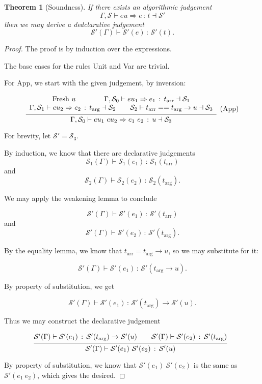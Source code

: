 \documentclass{article}
\newtheorem{theorem}{Theorem}
\newcommand{\G}{\Gamma}
\newcommand{\St}{\mathcal{S}}
\newcommand{\tp}{t}
\newcommand{\tarr}{t_{\text{arr}}}
\newcommand{\targ}{t_{\text{arg}}}
\newcommand{\uv}{u}
\newcommand{\eu}{eu}
\newcommand{\e}{e}
\newcommand{\spc}{\qquad}
\newcommand{\eq}{==}
\renewcommand{\implies}{\Rightarrow}
\newcommand{\fresh}{\text{Fresh}\ }
\newcommand{\withtp}[2]{{#1} \,:\, {#2}}
\newcommand{\app}[2]{{#1}\ {#2}}
\newcommand{\arr}[2]{{#1} \to {#2}}
\newcommand{\hastp}[3]{#1 \vdash {\withtp {#2} {#3}}}
\newcommand{\algtp}[6]{#1, #2 \vdash #3 \implies {\withtp {#4} {#5}} \dashv #6}
\newcommand{\equals}[4]{{#1} \vdash {#2} \eq {#3} \dashv {#4}}
\newcommand{\deduct}[3][]
{
  \begin{prooftree}
    \hypo{#2}
    \infer1[\text{#1}]{#3}
  \end{prooftree}
}
\begin{document}
\begin{theorem}[Soundness]
  If there exists an algorithmic judgement
\[ \algtp \G \St \eu \e \tp \St' \]
  then we may derive a dedclarative judgement
\[ \hastp {\St'(\G)} {\St'(\e)} {\St'(t)}.\]
\end{theorem}

\begin{proof}
  The proof is by induction over the expressions.

  The base cases for the rules Unit and Var are trivial.

  For App, we start with the given judgement, by inversion:

\[
  \deduct
  {\begin{array}{c}
    \fresh \uv \spc \spc
   \algtp \G {\St_0} {\eu_1} {\e_1} \tarr {\St_1} \\
   \algtp \G {\St_1} {\eu_2} {\e_2} \targ {\St_2} \spc
   \equals {\St_2} {\tarr} {\arr {\targ} \uv} {\St_3}
   \end{array}
  }
  {\algtp \G {\St_0} {\app {\eu_1} {\eu_2}} {\app {\e_1} {\e_2}} {\uv} {\St_3}}
  {\text{(App)}}
\]

  For brevity, let \(\St' = \St_3\).

  By induction, we know that there are declarative judgements
  \[ \hastp {\St_1(\G)} {\St_1(\e_1)} {\St_1(\tarr)} \]
  and
  \[ \hastp {\St_2(\G)} {\St_2(\e_2)} {\St_2(\targ)}.\]

  We may apply the weakening lemma to conclude 

  \[ \hastp {\St'(\G)} {\St'(\e_1)} {\St'(\tarr)} \]
  and
  \[ \hastp {\St'(\G)} {\St'(\e_2)} {\St'(\targ)}.\]

  By the equality lemma, we know that \(\tarr = \arr \targ \uv\), so we may
  substitute for it:

  \[ \hastp {\St'(\G)} {\St'(\e_1)} {\St'(\arr \targ \uv)}.\]

  By property of substitution, we get

  \[ \hastp {\St'(\G)} {\St'(\e_1)} {\arr {\St'(\targ)} {\St'(\uv)}}.\]

  Thus we may construct the declarative judgement
  
  \[
    \deduct
    {\hastp {\St'(\G)} {\St'(\e_1)} {\arr {\St'(\targ)} {\St'(\uv)}} \spc
     \hastp {\St'(\G)} {\St'(\e_2)} {\St'(\targ)}
    }
    {\hastp {\St'(\G)} {\app {\St'(\e_1)} {\St'(\e_2)}} {\St'(\uv)}}
    {}
  \]

  By property of substitution, we know that \(\app {\St'(\e_1)} {\St'(\e_2)}\) is
  the same as \(\St'(\app {\e_1} {\e_2})\), which gives the desired.


\end{proof}
\end{document}
